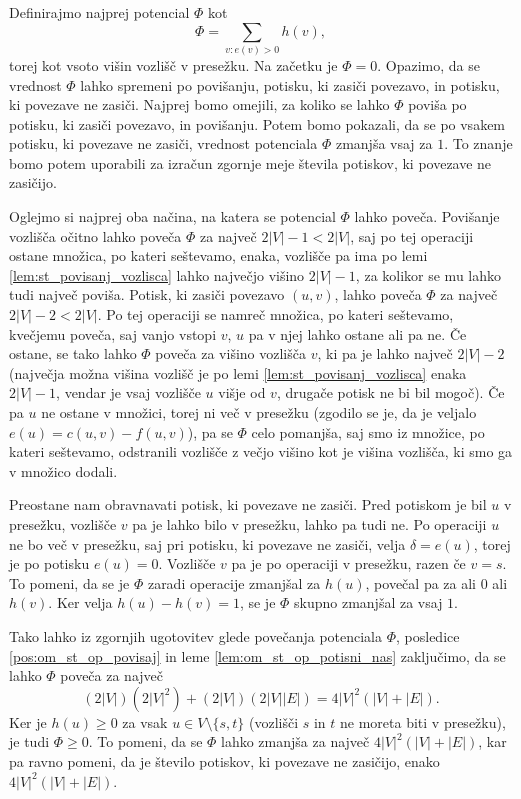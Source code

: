 \documentclass[mat1]{fmfdelo}
\begin{document}
\begin{dokaz}
Definirajmo najprej potencial $\Phi$ kot \[\Phi = \sum_{v:e(v) > 0} h(v),\] torej kot vsoto višin vozlišč v presežku. Na začetku je $\Phi = 0$. Opazimo, da se vrednost $\Phi$ lahko spremeni po povišanju, potisku, ki zasiči povezavo, in potisku, ki povezave ne zasiči. Najprej bomo omejili, za koliko se lahko $\Phi$ poviša po potisku, ki zasiči povezavo, in povišanju. Potem bomo pokazali, da se po vsakem potisku, ki povezave ne zasiči, vrednost potenciala $\Phi$ zmanjša vsaj za $1$. To znanje bomo potem uporabili za izračun zgornje meje števila potiskov, ki povezave ne zasičijo.

Oglejmo si najprej oba načina, na katera se potencial $\Phi$ lahko poveča. Povišanje vozlišča očitno lahko poveča $\Phi$ za največ $2|V| - 1 < 2|V|$, saj po tej operaciji ostane množica, po kateri seštevamo, enaka, vozlišče pa ima po lemi \ref{lem:st_povisanj_vozlisca} lahko največjo višino $2|V|-1$, za kolikor se mu lahko tudi največ poviša. Potisk, ki zasiči povezavo $(u,v)$, lahko poveča $\Phi$ za največ $2|V|-2 < 2|V|$. Po tej operaciji se namreč množica, po kateri seštevamo, kvečjemu poveča, saj vanjo vstopi $v$, $u$ pa v njej lahko ostane ali pa ne. Če ostane, se tako lahko $\Phi$ poveča za višino vozlišča $v$, ki pa je lahko največ $2|V|-2$ (največja možna višina vozlišč je po lemi \ref{lem:st_povisanj_vozlisca} enaka $2|V| - 1$, vendar je vsaj vozlišče $u$ višje od $v$, drugače potisk ne bi bil mogoč). Če pa $u$ ne ostane v množici, torej ni več v presežku (zgodilo se je, da je veljalo $e(u) = c(u,v) - f(u,v)$), pa se $\Phi$ celo pomanjša, saj smo iz množice, po kateri seštevamo, odstranili vozlišče z večjo višino kot je višina vozlišča, ki smo ga v množico dodali.

Preostane nam obravnavati potisk, ki povezave ne zasiči. Pred potiskom je bil $u$ v presežku, vozlišče $v$ pa je lahko bilo v presežku, lahko pa tudi ne. Po operaciji $u$ ne bo več v presežku, saj pri potisku, ki povezave ne zasiči, velja $\delta = e(u)$, torej je po potisku $e(u) = 0$. Vozlišče $v$ pa je po operaciji v presežku, razen če $v = s$. To pomeni, da se je $\Phi$ zaradi operacije zmanjšal za $h(u)$, povečal pa za ali $0$ ali $h(v)$. Ker velja $h(u) - h(v) = 1$, se je $\Phi$ skupno zmanjšal za vsaj $1$.

Tako lahko iz zgornjih ugotovitev glede povečanja potenciala $\Phi$, posledice \ref{pos:om_st_op_povisaj} in leme \ref{lem:om_st_op_potisni_nas} zaključimo, da se lahko $\Phi$ poveča za največ \[(2|V|) (2|V|^2) + (2|V|) (2|V||E|) = 4|V|^2 (|V| + |E|).\] Ker je $h(u) \geq 0$ za vsak $u \in V \setminus \{s,t\}$ (vozlišči $s$ in $t$ ne moreta biti v presežku), je tudi $\Phi \geq 0$. To pomeni, da se $\Phi$ lahko zmanjša za največ $4|V|^2 (|V| + |E|)$, kar pa ravno pomeni, da je število potiskov, ki povezave ne zasičijo, enako $4|V|^2 (|V| + |E|)$.
\end{dokaz}
\end{document}

